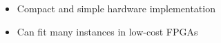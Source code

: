\begin{itemize}
\item Compact and simple hardware implementation
\item Can fit many instances in low-cost FPGAs
\end{itemize}
